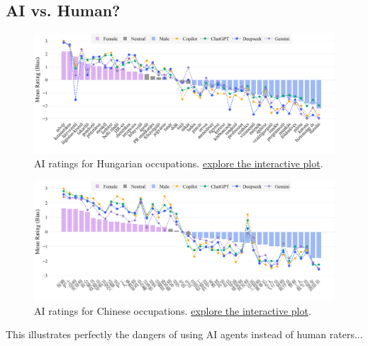 \documentclass[11pt]{article}
\begin{document}
\subsection{AI vs. Human?}

\begin{figure}
  \centering
  \includegraphics[width=\linewidth]{../occupations_hu_with_ai}
  \caption{AI ratings for Hungarian occupations. \href{https://htmlpreview.github.io/?https://github.com/partigabor/occupational-bias/blob/main/occupations_hu_with_ai.html}{explore the interactive plot}.}
  \label{fig:occupations_hu_with_ai}
\end{figure}

\begin{figure}
  \centering
  \includegraphics[width=\linewidth]{../occupations_zh_with_ai}
  \caption{AI ratings for Chinese occupations. \href{https://htmlpreview.github.io/?https://github.com/partigabor/occupational-bias/blob/main/occupations_zh_with_ai.html}{explore the interactive plot}.}
  \label{fig:occupations_zh_with_ai}
\end{figure}

This illustrates perfectly the dangers of using AI agents instead of human raters...




\end{document}
